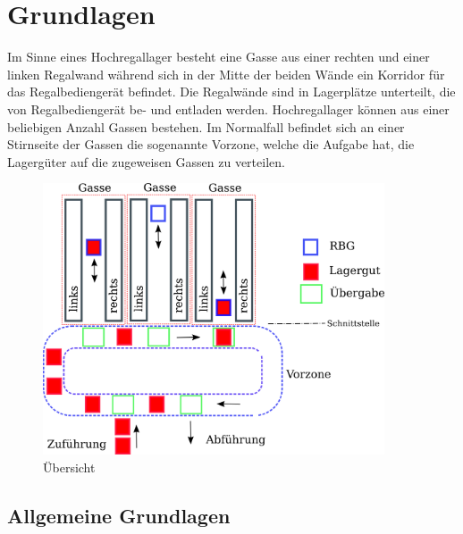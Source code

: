 \section{Grundlagen}
Im Sinne eines Hochregallager besteht eine Gasse aus einer rechten und einer linken Regalwand während sich in der Mitte der beiden Wände ein Korridor für das Regalbediengerät befindet. Die Regalwände sind in Lagerplätze unterteilt, die von Regalbediengerät be- und entladen werden. Hochregallager können aus einer beliebigen Anzahl Gassen bestehen. Im Normalfall befindet sich an einer Stirnseite der Gassen die sogenannte Vorzone, welche die Aufgabe hat, die Lagergüter auf die zugeweisen Gassen zu verteilen. 
%
\begin{figure}[h]
  \begin{center}
    \includegraphics[width=0.9\textwidth]{images/uebersicht.png}
    \caption{Übersicht}
    \label{fig:overview}
  \end{center}
\end{figure}
%

%
\subsection{Allgemeine Grundlagen}



%

